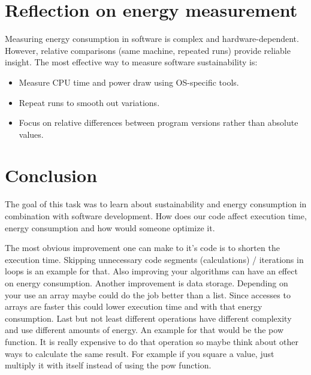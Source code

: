 \documentclass[twocolumn,10pt]{article}
\begin{document}
\section{Reflection on energy measurement}

Measuring energy consumption in software is complex and hardware-dependent. However, relative comparisons (same machine, repeated runs) provide reliable insight. The most effective way to measure software sustainability is:

\begin{itemize}
    \item Measure CPU time and power draw using OS-specific tools.
    \item Repeat runs to smooth out variations.
    \item Focus on relative differences between program versions rather than absolute values.
\end{itemize}

\section{Conclusion}
The goal of this task was to learn about sustainability and energy consumption in combination with software development. How does our code affect execution time, energy consumption and how would someone optimize it.

The most obvious improvement one can make to it's code is to shorten the execution time. Skipping unnecessary code segments (calculations) / iterations in loops is an example for that.
Also improving your algorithms can have an effect on energy consumption.
Another improvement is data storage. Depending on your use an array maybe could do the job better than a list. Since accesses to arrays are faster this could lower execution time and with that energy consumption.
Last but not least different operations have different complexity and use different amounts of energy.
An example for that would be the pow function. It is really expensive to do that operation so maybe think about other ways to calculate the same result. For example if you square a value, just multiply it with itself instead of using the pow function.


\end{document}
